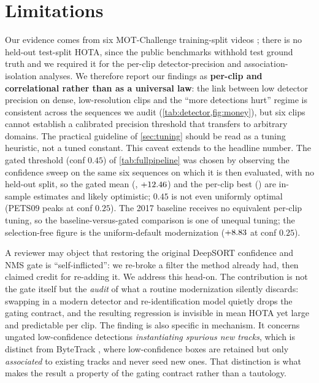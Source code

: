 \section{Limitations}
\label{sec:limitations}

Our evidence comes from six MOT-Challenge training-split videos
\cite{leal2015mot15,milan2016mot16}; there is no held-out test-split HOTA,
since the public benchmarks withhold test ground truth and we required it for
the per-clip detector-precision and association-isolation analyses. We
therefore report our findings as \textbf{per-clip and correlational rather
than as a universal law}: the link between low detector precision on dense,
low-resolution clips and the ``more detections hurt'' regime is consistent
across the sequences we audit (\cref{tab:detector,fig:money}), but six clips
cannot establish a calibrated precision threshold that transfers to arbitrary
domains. The practical guideline of \cref{sec:tuning} should be read as a
tuning heuristic, not a tuned constant. This caveat extends to the headline
number. The gated threshold (conf $0.45$) of \cref{tab:fullpipeline} was chosen
by observing the confidence sweep on the same six sequences on which it is then
evaluated, with no held-out split, so the gated mean (\modernHOTA{},
$+12.46$) and the per-clip best (\modernBestHOTA{}) are in-sample estimates
and likely optimistic; $0.45$ is not even uniformly optimal (PETS09 peaks at conf
$0.25$). The 2017 baseline receives no equivalent per-clip tuning, so the
baseline-versus-gated comparison is one of unequal tuning; the selection-free
figure is the uniform-default modernization ($+8.83$ at conf $0.25$).

A reviewer may object that restoring the original DeepSORT confidence and NMS
gate is ``self-inflicted'': we re-broke a filter the method already had, then
claimed credit for re-adding it. We address this head-on. The contribution is
not the gate itself but the \emph{audit} of what a routine modernization
silently discards: swapping in a modern detector and re-identification model
\cite{jocher2023yolov8,zhou2019osnet} quietly drops the gating contract, and
the resulting regression is invisible in mean HOTA yet large and predictable
per clip. The finding is also specific in mechanism. It concerns ungated
low-confidence detections \emph{instantiating spurious new tracks}, which is
distinct from ByteTrack \cite{zhang2022bytetrack}, where low-confidence boxes
are retained but only \emph{associated} to existing tracks and never seed new
ones. That distinction is what makes the result a property of the gating
contract rather than a tautology.

